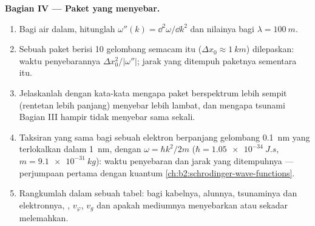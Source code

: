 \begin{problem}
\medskip
\noindent\textbf{Bagian IV --- Paket yang menyebar.}
\begin{enumerate}[resume]
  \item Bagi air dalam, hitunglah $\omega''(k) = \dd^2\omega/\dd k^2$ dan nilainya
        bagi $\lambda = \qty{100}{m}$.
  \item Sebuah paket berisi \qty{10}{} gelombang semacam itu ($\Delta x_0 \approx \qty{1}{km}$)
        dilepaskan: waktu penyebarannya $\Delta x_0^2/|\omega''|$; jarak yang ditempuh
        paketnya sementara itu.
  \item Jelaskanlah dengan kata-kata mengapa paket berspektrum lebih sempit
        (rentetan lebih panjang) menyebar lebih lambat, dan mengapa tsunami
        Bagian III hampir tidak menyebar sama sekali.
  \item Taksiran yang sama bagi sebuah elektron berpanjang gelombang \qty{0.1}{nm}
        yang terlokalkan dalam \qty{1}{nm}, dengan $\omega = \hbar k^2/2m$ ($\hbar =
        \qty{1.05e-34}{J.s}$, $m = \qty{9.1e-31}{kg}$): waktu penyebaran dan
        jarak yang ditempuhnya --- perjumpaan pertama dengan 
        kuantum \cref{ch:b2:schrodinger-wave-functions}.
  \item Rangkumlah dalam sebuah tabel: bagi kabelnya, alunnya, tsunaminya dan
        elektronnya, , $v_\varphi$, $v_g$ dan
        apakah mediumnya menyebarkan atau sekadar melemahkan.
\end{enumerate}
\end{problem}
